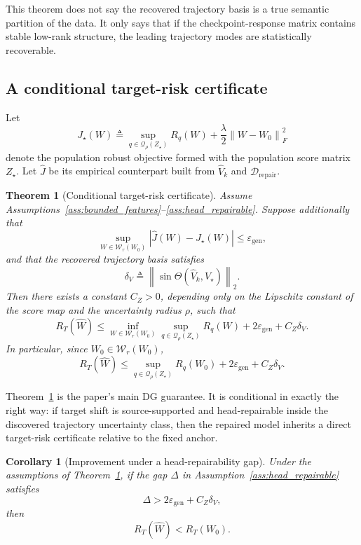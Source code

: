 \documentclass{article}
\newtheorem{theorem}{Theorem}
\newtheorem{corollary}{Corollary}
\newcommand{\cD}{\mathcal{D}}
\newcommand{\cQ}{\mathcal{Q}}
\newcommand{\cW}{\mathcal{W}}
\newcommand{\1}{\mathbbm{1}}
\newcommand{\abs}[1]{\left\lvert #1 \right\rvert}
\newcommand{\norm}[1]{\left\lVert #1 \right\rVert}
\begin{document}
This theorem does not say the recovered trajectory basis is a true semantic partition of the data. It only says that if the checkpoint-response matrix contains stable low-rank structure, the leading trajectory modes are statistically recoverable.

\subsection{A conditional target-risk certificate}

Let
\[
    J_\star(W)
    \triangleq
    \sup_{q\in\cQ_\rho(Z_\star)} R_q(W)
    +
    \frac{\lambda}{2}\norm{W-W_0}_F^2
\]
denote the population robust objective formed with the population score matrix \(Z_\star\). Let \(\widehat J\) be its empirical counterpart built from \(\widehat V_k\) and \(\cD_{\mathrm{repair}}\).

\begin{theorem}[Conditional target-risk certificate]
\label{thm:certificate}
Assume Assumptions~\ref{ass:bounded_features}--\ref{ass:head_repairable}. Suppose additionally that
\[
    \sup_{W\in\cW_r(W_0)}
    \abs{\widehat J(W) - J_\star(W)}
    \le
    \varepsilon_{\mathrm{gen}},
\]
and that the recovered trajectory basis satisfies
\[
    \delta_V
    \triangleq
    \norm{\sin \Theta(\widehat V_k,V_\star)}_2.
\]
Then there exists a constant \(C_Z>0\), depending only on the Lipschitz constant of the score map and the uncertainty radius \(\rho\), such that
\[
    R_T(\widehat W)
    \le
    \inf_{W\in\cW_r(W_0)}
    \sup_{q\in\cQ_\rho(Z_\star)} R_q(W)
    +
    2\varepsilon_{\mathrm{gen}}
    +
    C_Z \delta_V.
\]
In particular, since \(W_0\in\cW_r(W_0)\),
\[
    R_T(\widehat W)
    \le
    \sup_{q\in\cQ_\rho(Z_\star)} R_q(W_0)
    +
    2\varepsilon_{\mathrm{gen}}
    +
    C_Z \delta_V.
\]
\end{theorem}

Theorem~\ref{thm:certificate} is the paper's main DG guarantee. It is conditional in exactly the right way: if target shift is source-supported and head-repairable inside the discovered trajectory uncertainty class, then the repaired model inherits a direct target-risk certificate relative to the fixed anchor.

\begin{corollary}[Improvement under a head-repairability gap]
\label{cor:improvement}
Under the assumptions of Theorem~\ref{thm:certificate}, if the gap \(\Delta\) in Assumption~\ref{ass:head_repairable} satisfies
\[
    \Delta > 2\varepsilon_{\mathrm{gen}} + C_Z \delta_V,
\]
then
\[
    R_T(\widehat W) < R_T(W_0).
\]
\end{corollary}
\end{document}
